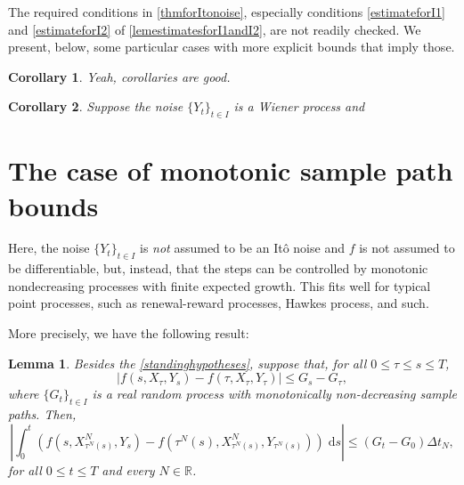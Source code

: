 \documentclass[reqno,12pt]{amsart}
\theoremstyle{plain}%
\newtheorem{lem}{Lemma}[section]
\newtheorem{cor}{Corollary}[section]
\theoremstyle{definition}
\begin{document}
The required conditions in \cref{thmforItonoise}, especially conditions \eqref{estimateforI1} and \eqref{estimateforI2} of \cref{lemestimatesforI1andI2}, are not readily checked. We present, below, some particular cases with more explicit bounds that imply those.

\begin{cor}
    Yeah, corollaries are good.
\end{cor}

\begin{cor}
    Suppose the noise $\{Y_t\}_{t\in I}$ is a Wiener process and 
\end{cor}

\section{The case of monotonic sample path bounds}
\label{secmonotonicbound}

Here, the noise $\{Y_t\}_{t\in I}$ is \emph{not} assumed to be an It\^o noise and $f$ is not assumed to be differentiable, but, instead, that the steps can be controlled by monotonic nondecreasing processes with finite expected growth. This fits well for typical point processes, such as renewal-reward processes, Hawkes process, and such.

More precisely, we have the following result:
\begin{lem}
    \label{lemmonotonicbound}
    Besides the \cref{standinghypotheses}, suppose that, for all $0 \leq \tau \leq s \leq T$,
    \begin{equation}
      \label{monotonicbound}
        |f(s, X_\tau, Y_s) - f(\tau, X_\tau, Y_\tau)| \leq G_s - G_\tau,
    \end{equation}
    where $\{G_t\}_{t\in I}$ is a real random process with monotonically non-decreasing sample paths. Then,
    \begin{equation}
      \label{intfboundbyG}
        \left|\int_0^t \left( f(s, X_{\tau^N(s)}^N, Y_s) - f(\tau^N(s), X_{\tau^N(s)}^N, Y_{\tau^N(s)}) \right)\;\mathrm{d}s\right| \leq (G_t - G_0)\Delta t_N,
    \end{equation}
    for all $0 \leq t \leq T$ and every $N\in \mathbb{R}$.
\end{lem}
\end{document}
